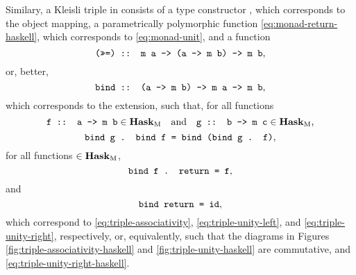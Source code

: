 Similary, a Kleisli triple in \hask consists of a type constructor
, which corresponds to the object mapping, a
parametrically polymorphic function 
\eqref{eq:monad-return-haskell}, which corresponds to
\eqref{eq:monad-unit}, and a function
\begin{equation*}
  \text{\texttt{(>>=) :: m a -> (a -> m b) -> m b}}
  \text{,}
\end{equation*}
or, better,
\begin{equation*}
  \text{\texttt{bind :: (a -> m b) -> m a -> m b}}
  \text{,}
\end{equation*}
which corresponds to the extension, such that, for all
functions
\begin{equation*}
  \text{\texttt{f :: a -> m b}} \in \mathcal{\mathbf{Hask}}_{\operatorname{M}}
  \quad
  \text{and}
  \quad
  \text{\texttt{g :: b -> m c}} \in \mathcal{\mathbf{Hask}}_{\operatorname{M}}
  \text{,}
\end{equation*}
\begin{equation}
  \label{eq:triple-associativity-haskell}
  \text{\texttt{bind g . bind f = bind (bind g . f)}}
  \text{,}
\end{equation}
for all functions  $\in \mathcal{\mathbf{Hask}}_{\operatorname{M}}$,
\begin{equation}
  \label{eq:triple-unity-left-haskell}
  \text{\texttt{bind f . return = f}}
  \text{,}
\end{equation}
and
\begin{equation}
  \label{eq:triple-unity-right-haskell}
  \text{\texttt{bind return = id}}
  \text{,}
\end{equation}
which correspond to \eqref{eq:triple-associativity},
\eqref{eq:triple-unity-left}, and \eqref{eq:triple-unity-right},
respectively, or, equivalently, such that the diagrams in Figures
\ref{fig:triple-associativity-haskell} and
\ref{fig:triple-unity-haskell} are commutative, and
\eqref{eq:triple-unity-right-haskell}.
